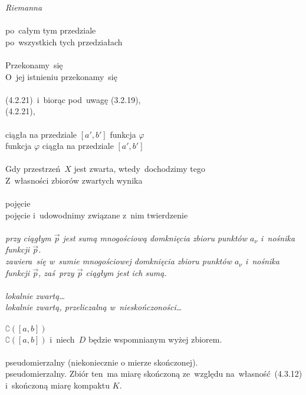 \documentclass[a4paper,11pt]{article}
\begin{document}
\Powin \emph{Riemanna} \\
 \\
\Jest  po~całym tym przedziale \\
\Powin po~wszystkich tych przedziałach \\
 \\
\Jest Przekonamy~się \\
\Powin  O~jej istnieniu przekonamy~się \\
 \\
\Jest (4.2.21)~i~biorąc pod~uwagę (3.2.19), \\
\Powin (4.2.21), \\
 \\
\Jest ciągła na przedziale $[ a', b' ]$ funkcja $\varphi$ \\
\Powin  funkcja $\varphi$ ciągła na przedziale $[ a', b' ]$ \\
 \\
\Jest Gdy przestrzeń~$X$ jest zwarta, wtedy~dochodzimy tego \\
\Powin  Z~własności zbiorów zwartych wynika \\
 \\
\Jest pojęcie \\
\Powin  pojęcie i~udowodnimy związane z~nim twierdzenie \\
 \\
\Jest \emph{przy ciągłym $\vec{ p }$ jest sumą mnogościową domknięcia
  zbioru punktów $a_{ \nu }$ i~nośnika
  funkcji $\vec{ p }$.} \\
\Powin \emph{zawiera~się w~sumie mnogościowej domknięcia zbioru
  punktów $a_{ \nu }$ i~nośnika funkcji $\vec{ p }$, zaś~przy
  $\vec{ p }$
  ciągłym jest ich sumą.} \\
 \\
\Jest \emph{lokalnie zwartą\ldots} \\
\Powin  \emph{lokalnie zwartą, przeliczalną w~nieskończoności\ldots} \\
 \\
\Jest $\complement ( [ a, b ] )$ \\
\Powin $\complement ( [ a, b ] )$ i~niech~$D$ będzie wspomnianym wyżej
zbiorem. \\
 \\
\Jest pseudomierzalny (niekoniecznie o mierze skończonej). \\
\Powin pseudomierzalny. Zbiór ten~ma miarę skończoną ze~względu
na~własność~(4.3.12) i~skończoną miarę kompaktu $K$. \\
\end{document}
